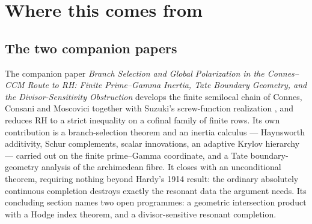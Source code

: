 \documentclass[11pt]{amsart}
\theoremstyle{definition}
\theoremstyle{remark}
\newcommand{\RH}{\mathrm{RH}}
\begin{document}
\begin{abstract}
Row (d) is thereby reduced to two named inputs: a uniform Schur angle bound
for that block, and a transfer comparison identifying the Gamma--Tate source
defect with the newborn-cell defect at unit constant.  The second is
finite-dimensional at each threshold; we evaluate it, and it fails --- the
comparison constant is below one and decays with the threshold, with the
finite-dimensional evaluation bounding the true constant from above.  The
source model therefore does not reach the exact condition, although the exact
condition is itself satisfied on every threshold tested.  Proving it directly,
in the output-defect metric where it carries constant one, is the remaining
problem.  Rows (a)--(c) and the certified initial range of row (d) are
unconditional; the global Hodge inequality and the Riemann Hypothesis remain
open.
\end{abstract}


\maketitle

\section{Where this comes from}

\subsection{The two companion papers}

The companion paper \emph{Branch Selection and Global Polarization in the
Connes--CCM Route to RH: Finite Prime--Gamma Inertia, Tate Boundary
Geometry, and the Divisor-Sensitivity Obstruction} develops the finite
semilocal chain of Connes, Consani and Moscovici \cite{CCM2025} together
with Suzuki's screw-function realization \cite{Suzuki2025,SuzukiScrew}, and
reduces $\RH$ to a strict inequality on a cofinal family of finite rows.  Its
own contribution is a branch-selection theorem and an inertia calculus ---
Haynsworth additivity, Schur complements, scalar innovations, an adaptive
Krylov hierarchy --- carried out on the finite prime--Gamma coordinate, and
a Tate boundary-geometry analysis of the archimedean fibre.  It closes with
an unconditional theorem, requiring nothing beyond Hardy's 1914 result: the
ordinary absolutely continuous completion destroys exactly the resonant data
the argument needs.  Its concluding section names two open programmes: a
geometric intersection product with a Hodge index theorem, and a
divisor-sensitive resonant completion.
\end{document}

